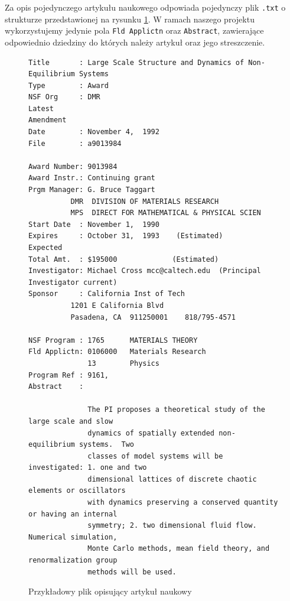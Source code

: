 \documentclass[a4paper,12pt]{article}
\begin{document}
		Za opis pojedynczego artykułu naukowego odpowiada pojedynczy plik
		\texttt{.txt} o strukturze przedstawionej na rysunku
		\ref{fig:textstruct}. W ramach naszego projektu wykorzystujemy  
		jedynie pola \texttt{Fld Applictn} oraz \texttt{Abstract}, 
		zawierające odpowiednio dziedziny do których należy artykuł oraz
		jego streszczenie.
		\begin{figure}[!h]
			\scriptsize
			\begin{verbatim}
Title       : Large Scale Structure and Dynamics of Non-Equilibrium Systems
Type        : Award
NSF Org     : DMR 
Latest
Amendment
Date        : November 4,  1992   
File        : a9013984

Award Number: 9013984
Award Instr.: Continuing grant                             
Prgm Manager: G. Bruce Taggart                        
	      DMR  DIVISION OF MATERIALS RESEARCH          
	      MPS  DIRECT FOR MATHEMATICAL & PHYSICAL SCIEN
Start Date  : November 1,  1990   
Expires     : October 31,  1993    (Estimated)
Expected
Total Amt.  : $195000             (Estimated)
Investigator: Michael Cross mcc@caltech.edu  (Principal Investigator current)
Sponsor     : California Inst of Tech
	      1201 E California Blvd
	      Pasadena, CA  911250001    818/795-4571

NSF Program : 1765      MATERIALS THEORY
Fld Applictn: 0106000   Materials Research                      
              13        Physics                                 
Program Ref : 9161,
Abstract    :
                                                                                             
              The PI proposes a theoretical study of the large scale and slow                
              dynamics of spatially extended non-equilibrium systems.  Two                   
              classes of model systems will be investigated: 1. one and two                  
              dimensional lattices of discrete chaotic elements or oscillators               
              with dynamics preserving a conserved quantity or having an internal            
              symmetry; 2. two dimensional fluid flow.  Numerical simulation,                
              Monte Carlo methods, mean field theory, and renormalization group              
              methods will be used.
			\end{verbatim}
			\caption{Przykładowy plik opisujący artykuł naukowy}
			\label{fig:textstruct}		
		\end{figure}
	
\end{document}
